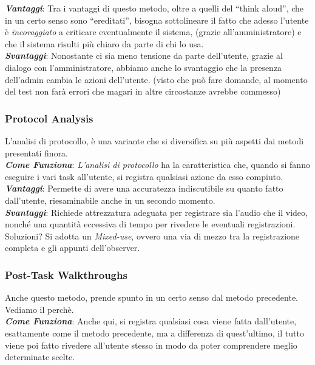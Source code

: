 \documentclass[oneside]{book}
\begin{document}
				\textbf{\emph{Vantaggi}}: Tra i vantaggi di questo metodo, oltre a quelli del ``think aloud'', che in un certo senso sono ``ereditati'', bisogna sottolineare il fatto che adesso l'utente è \emph{incoraggiato} a criticare eventualmente il sistema, (grazie all'amministratore) e che il sistema risulti più chiaro da parte di chi lo usa. \\

				\textbf{\emph{Svantaggi}}: Nonostante ci sia meno tensione da parte dell'utente, grazie al dialogo con l'amministratore, abbiamo anche lo svantaggio che la presenza dell'admin cambia le azioni dell'utente. (visto che può fare domande, al momento del test non farà errori che magari in altre circostanze avrebbe commesso)

			\subsubsection{Protocol Analysis}
				L'analisi di protocollo, è una variante che si diversifica su più aspetti dai metodi presentati finora. \\

				\textbf{\emph{Come Funziona}}: \emph{L'analisi di protocollo} ha la caratteristica che, quando si fanno eseguire i vari task all'utente, si registra qualsiasi azione da esso compiuto.\\

				\textbf{\emph{Vantaggi}}: Permette di avere una accuratezza indiscutibile su quanto fatto dall'utente, riesaminabile anche in un secondo momento. \\

				\textbf{\emph{Svantaggi}}: Richiede attrezzatura adeguata per registrare sia l'audio che il video, nonché una quantità eccessiva di tempo per rivedere le eventuali registrazioni. Soluzioni? Si adotta un \emph{Mixed-use}, ovvero una via di mezzo tra la registrazione completa e gli appunti dell'observer.				

			\subsubsection{Post-Task Walkthroughs}
				Anche questo metodo, prende spunto in un certo senso dal metodo precedente. Vediamo il perchè. \\

				\textbf{\emph{Come Funziona}}: Anche qui, si registra qualsiasi cosa viene fatta dall'utente, esattamente come il metodo precedente, ma a differenza di quest'ultimo, il tutto viene poi fatto rivedere all'utente stesso in modo da poter comprendere meglio determinate scelte. \\
\end{document}
